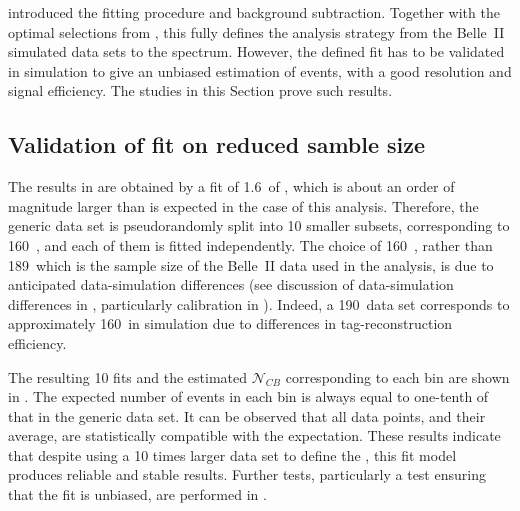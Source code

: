  introduced the fitting procedure and \BB background subtraction.
Together with the optimal selections from , this fully defines the analysis strategy from the Belle~II simulated data sets to the \BtoXsgamma spectrum.
However, the defined fit has to be validated in simulation to give an unbiased estimation of \BtoXsgamma events, with a good resolution and signal efficiency.
The studies in this Section prove such results.

\subsection{Validation of \texorpdfstring{\Mbc}{Mbc} fit on reduced samble size}\label{sec:mbc_fit_validation_misreconstructed}

The results in  are obtained by a fit of 1.6~\invab of \MC, which is about an order of magnitude larger than is expected in the case of this analysis.
Therefore, the generic \MC data set is pseudorandomly split into 10 smaller subsets, corresponding to 160~\invfb, and each of them is fitted independently.
The choice of 160~\invfb, rather than 189~\invfb which is the sample size of the Belle~II data used in the analysis, 
is due to anticipated data-simulation differences (see discussion of data-simulation differences in , particularly \FEI calibration in ).
Indeed, a 190~\invfb data set corresponds to approximately 160~\invfb in simulation due to differences in tag-\B reconstruction efficiency.

The resulting 10 fits and the estimated $\mathcal{N}_{CB}$ corresponding to each \EB bin are shown in .
The expected number of events in each bin is always equal to one-tenth of that in the generic \MC data set.
It can be observed that all data points, and their average, are statistically compatible with the expectation.
These results indicate that despite using a 10 times larger data set to define the , this \Mbc fit model produces reliable and stable results.
Further tests, particularly a test ensuring that the fit is unbiased, are performed in .

